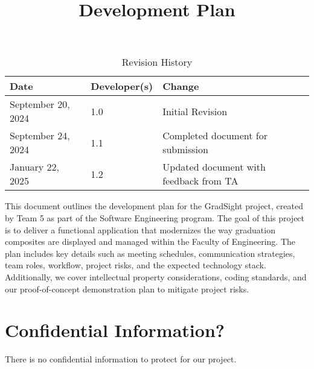 \documentclass{article}
\title{Development Plan\\\progname}
\author{\authname}
\date{}
\begin{document}
\maketitle

\begin{table}[hp]
\caption{Revision History} \label{TblRevisionHistory}
\begin{tabularx}{\textwidth}{llX}
\toprule
\textbf{Date} & \textbf{Developer(s)} & \textbf{Change}\\
\midrule
September 20, 2024 & 1.0 & Initial Revision\\
September 24, 2024 & 1.1 & Completed document for submission\\
January 22, 2025 & 1.2 & Updated document with feedback from TA\\
\bottomrule
\end{tabularx}
\end{table}

\newpage{}


This document outlines the development plan for the GradSight project, created by Team 5 as part of the Software Engineering program. The goal of this project is to deliver a functional application that modernizes the way graduation composites are displayed and managed within the Faculty of Engineering. The plan includes key details such as meeting schedules, communication strategies, team roles, workflow, project risks, and the expected technology stack. Additionally, we cover intellectual property considerations, coding standards, and our proof-of-concept demonstration plan to mitigate project risks.

\section{Confidential Information?}




There is no confidential information to protect for our project. 
\end{document}
